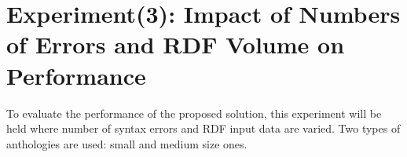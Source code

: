 \section{Experiment(3): Impact of Numbers of Errors and RDF Volume on Performance }
To evaluate the performance of the proposed solution, this experiment will be held where number of syntax errors and RDF input data are varied. Two types of anthologies are used: small and medium size ones.  










